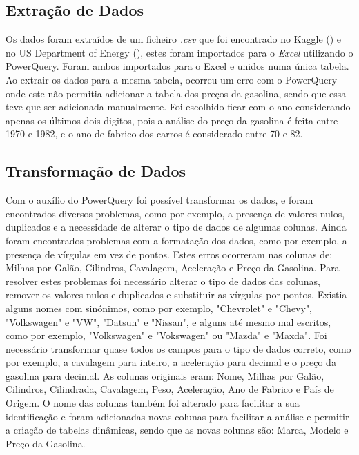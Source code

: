 \documentclass[a4paper]{article}
\begin{document}
\subsection{Extração de Dados}
Os dados foram extraídos de um ficheiro \textit{.csv} que foi encontrado no Kaggle (\cite{kaggle}) e no US Department of Energy (\cite{usdoe}), 
estes foram importados para o \textit{Excel} utilizando o PowerQuery. Foram ambos importados para o Excel e unidos numa única tabela.
\\
Ao extrair os dados para a mesma tabela, ocorreu um erro com o PowerQuery onde este não permitia adicionar
a tabela dos preços da gasolina, sendo que essa teve que ser adicionada manualmente. Foi escolhido ficar com o ano
considerando apenas os últimos dois digitos, pois a análise do preço da gasolina é feita entre 1970 e 1982, e o ano de fabrico dos carros
é considerado entre 70 e 82.

\subsection{Transformação de Dados}
Com o auxílio do PowerQuery foi possível transformar os dados, e foram encontrados diversos problemas,
como por exemplo, a presença de valores nulos, duplicados e a necessidade de alterar o tipo de dados de algumas colunas.
Ainda foram encontrados problemas com a formatação dos dados, como por exemplo, a presença de vírgulas em vez de pontos. 
Estes erros ocorreram nas colunas de: Milhas por Galão, Cilindros, Cavalagem, Aceleração e Preço da Gasolina.
Para resolver estes problemas foi necessário alterar o tipo de dados das colunas, remover os valores nulos e duplicados e substituir as vírgulas por pontos.
Existia alguns nomes com sinónimos, como por exemplo, "Chevrolet" e "Chevy", "Volkswagen" e "VW", "Datsun" e "Nissan", e alguns até mesmo mal escritos, 
como por exemplo, "Volkswagen" e "Vokswagen" ou "Mazda" e "Maxda".
Foi necessário transformar quase todos os campos para o tipo de dados correto, como por exemplo, a cavalagem para inteiro, 
a aceleração para decimal e o preço da gasolina para decimal.
As colunas originais eram: Nome, Milhas por Galão, Cilindros, Cilindrada, Cavalagem, Peso, Aceleração, Ano de Fabrico e País de Origem.
O nome das colunas também foi alterado para facilitar a sua identificação e foram adicionadas novas colunas para facilitar a análise
e permitir a criação de tabelas dinâmicas, sendo que as novas colunas são: Marca, Modelo e Preço da Gasolina.
\end{document}
